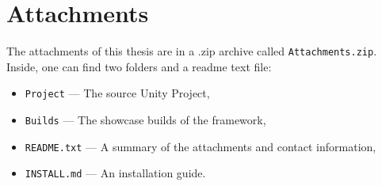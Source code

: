 \chapter{Attachments}

The attachments of this thesis are in a .zip archive called \verb|Attachments.zip|. Inside, one can find two folders and a readme text file: 
\begin{itemize}
    \item     \verb|Project| — The source Unity Project,
    \item \verb|Builds| — The showcase builds of the framework,
    \item \verb|README.txt| — A summary of the attachments and contact information,
    \item \verb|INSTALL.md| — An installation guide.
\end{itemize}